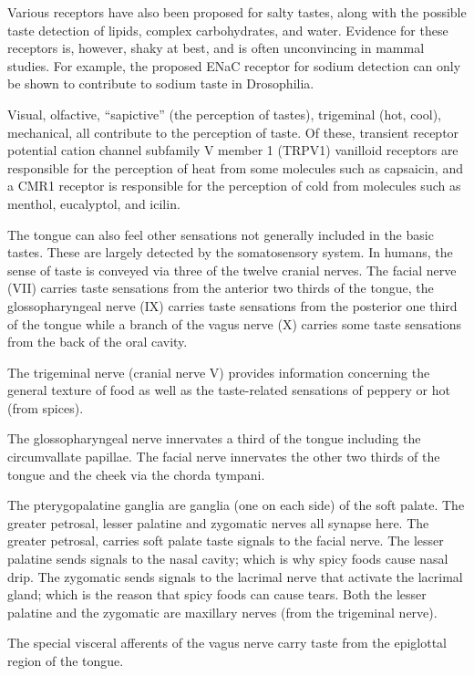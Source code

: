 Various receptors have also been proposed for salty tastes, along with the possible taste detection of lipids, complex carbohydrates, and water. Evidence for these receptors is, however, shaky at best, and is often unconvincing in mammal studies. For example, the proposed ENaC receptor for sodium detection can only be shown to contribute to sodium taste in Drosophilia.

Visual, olfactive, ``sapictive'' (the perception of tastes), trigeminal (hot, cool), mechanical, all contribute to the perception of taste. Of these, transient receptor potential cation channel subfamily V member 1 (TRPV1) vanilloid receptors are responsible for the perception of heat from some molecules such as capsaicin, and a CMR1 receptor is responsible for the perception of cold from molecules such as menthol, eucalyptol, and icilin.

The tongue can also feel other sensations not generally included in the basic tastes. These are largely detected by the somatosensory system. In humans, the sense of taste is conveyed via three of the twelve cranial nerves. The facial nerve (VII) carries taste sensations from the anterior two thirds of the tongue, the glossopharyngeal nerve (IX) carries taste sensations from the posterior one third of the tongue while a branch of the vagus nerve (X) carries some taste sensations from the back of the oral cavity.

The trigeminal nerve (cranial nerve V) provides information concerning the general texture of food as well as the taste-related sensations of peppery or hot (from spices).

The glossopharyngeal nerve innervates a third of the tongue including the circumvallate papillae. The facial nerve innervates the other two thirds of the tongue and the cheek via the chorda tympani.

The pterygopalatine ganglia are ganglia (one on each side) of the soft palate. The greater petrosal, lesser palatine and zygomatic nerves all synapse here. The greater petrosal, carries soft palate taste signals to the facial nerve. The lesser palatine sends signals to the nasal cavity; which is why spicy foods cause nasal drip. The zygomatic sends signals to the lacrimal nerve that activate the lacrimal gland; which is the reason that spicy foods can cause tears. Both the lesser palatine and the zygomatic are maxillary nerves (from the trigeminal nerve).

The special visceral afferents of the vagus nerve carry taste from the epiglottal region of the tongue.


